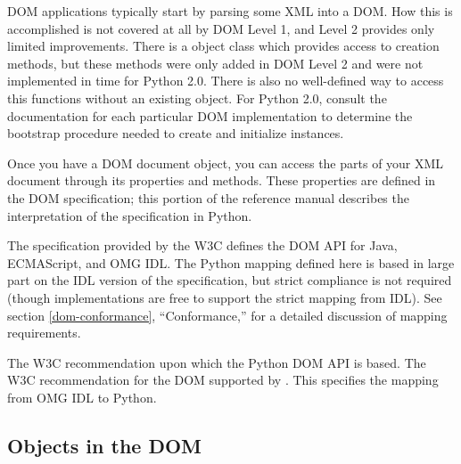 DOM applications typically start by parsing some XML into a DOM.  How
this is accomplished is not covered at all by DOM Level 1, and Level 2
provides only limited improvements.  There is a
 object class which provides access to
 creation methods, but these methods were only added
in DOM Level 2 and were not implemented in time for Python 2.0.  There
is also no well-defined way to access this functions without an
existing  object.  For Python 2.0, consult the
documentation for each particular DOM implementation to determine the
bootstrap procedure needed to create and initialize 
instances.

Once you have a DOM document object, you can access the parts of your
XML document through its properties and methods.  These properties are
defined in the DOM specification; this portion of the reference manual
describes the interpretation of the specification in Python.

The specification provided by the W3C defines the DOM API for Java,
ECMAScript, and OMG IDL.  The Python mapping defined here is based in
large part on the IDL version of the specification, but strict
compliance is not required (though implementations are free to support
the strict mapping from IDL).  See section \ref{dom-conformance},
``Conformance,'' for a detailed discussion of mapping requirements.


\begin{seealso}
           {The W3C recommendation upon which the Python DOM API is
            based.}
           {The W3C recommendation for the
            DOM supported by .}
           {This specifies the mapping from OMG IDL to Python.}
\end{seealso}


\subsection{Objects in the DOM \label{dom-objects}}

